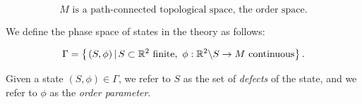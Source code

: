 $$M\text{ is a path-connected topological space, the order space.}$$

We define the phase space of states in the theory as follows:

\begin{equation}\label{phase-space-ordered-media}
\Gamma = \left\{\left. (S,\phi)\,\right| S\subset {\mathbb R}^2 \text{ finite}, \,\, \phi: {\mathbb R}^2\backslash S \to M \text{ continuous}\right\}.
\end{equation}

Given a state $(S,\phi)\in \Gamma$, we refer to $S$ as the set of {\em defects} of the state, and we refer to $\phi$ as the {\em order parameter}.




